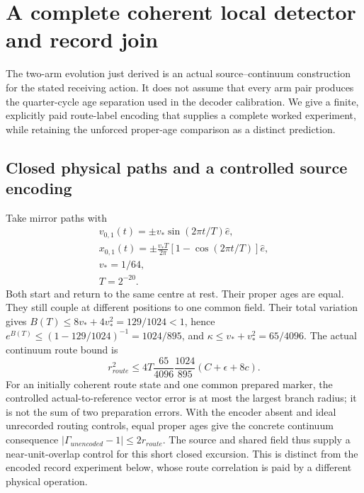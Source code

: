 \section{A complete coherent local detector and record join}
\label{sec:new-join}
The two-arm evolution just derived is an actual source--continuum
construction for the stated receiving action. It does not assume that
every arm pair produces the quarter-cycle age separation used in the
decoder calibration. We give a finite, explicitly paid route-label
encoding that supplies a complete worked experiment, while retaining
the unforced proper-age comparison as a distinct prediction.

\subsection{Closed physical paths and a controlled source encoding}
Take mirror paths with
\[\begin{gathered}
v_{0,1}(t)=\pm v_*\sin(2\pi t/T)\widehat e,\\
 x_{0,1}(t)=\pm\frac{v_*T}{2\pi}[1-\cos(2\pi t/T)]\widehat e,
 \\
 v_*=1/64,\\
 T=2^{-20}.
\end{gathered}\]
Both start and return to the same centre at rest. Their proper ages are
equal. They still couple at different positions to one common field.
Their total variation gives
\(B(T)\leq8v_*+4v_*^2=129/1024<1\), hence
\(e^{B(T)}\leq(1-129/1024)^{-1}=1024/895\), and
\(\kappa\leq v_*+v_*^2=65/4096\). The actual continuum route bound is
\begin{equation}
 r_{route}^2\leq4T\frac{65}{4096}\frac{1024}{895}
                  (C+\epsilon+8c).
 \label{eq:new-numeric-route}
\end{equation}
For an initially coherent route state and one common prepared marker,
the controlled actual-to-reference vector error is at most the largest
branch radius; it is not the sum of two preparation errors.
With the encoder absent and ideal unrecorded routing controls, equal
proper ages give the concrete continuum consequence
\( |\Gamma_{unencoded}-1|\leq2r_{route}\).
The source and shared field thus supply a near-unit-overlap control for
this short closed excursion. This is distinct from the encoded record
experiment below, whose route correlation is paid by a different physical
operation.

